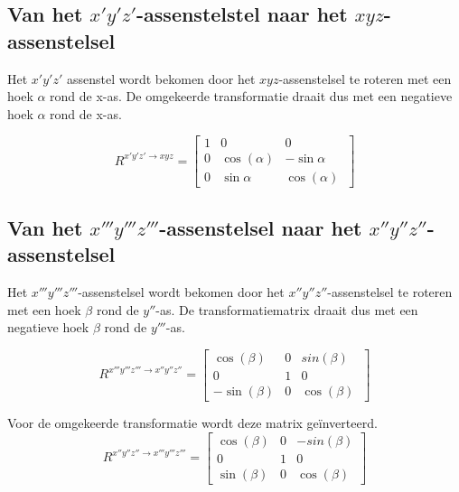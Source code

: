 
\subsection{Van het $x'y'z'$-assenstelstel naar het $xyz$-assenstelsel}
Het $x'y'z'$ assenstel wordt bekomen door het $xyz$-assenstelsel te roteren met een hoek $\alpha$ rond de x-as. De omgekeerde transformatie draait dus met een negatieve hoek $\alpha$ rond de x-as.

\begin{equation*}
R^{x'y'z' \rightarrow xyz}=
  \begin{bmatrix}
    1 & 0 & 0\\
    0 & \cos(\alpha) & -\sin{\alpha}\\ 
    0 & \sin{\alpha} & \cos(\alpha)\
    \end{bmatrix}
\end{equation*}



\subsection{Van het $x'''y'''z'''$-assenstelsel naar het $x''y''z''$-assenstelsel}
Het $x'''y'''z'''$-assenstelsel wordt bekomen door het $x''y''z''$-assenstelsel te roteren met een hoek $\beta$ rond de $y''$-as. De transformatiematrix draait dus met een negatieve hoek $\beta$ rond de $y'''$-as.

\begin{equation*}
R^{x'''y'''z''' \rightarrow x''y''z''}=
  \begin{bmatrix}
    \cos(\beta) & 0 & sin(\beta)\\
    0 & 1 & 0\\ 
    -\sin(\beta) & 0 & \cos(\beta)\
    \end{bmatrix}
\end{equation*}

Voor de omgekeerde transformatie wordt deze matrix ge\"inverteerd.
\begin{equation*}
R^{x''y''z'' \rightarrow x'''y'''z'''}=
  \begin{bmatrix}
    \cos(\beta) & 0 & -sin(\beta)\\
    0 & 1 & 0\\ 
    \sin(\beta) & 0 & \cos(\beta)\
    \end{bmatrix}
\end{equation*}


